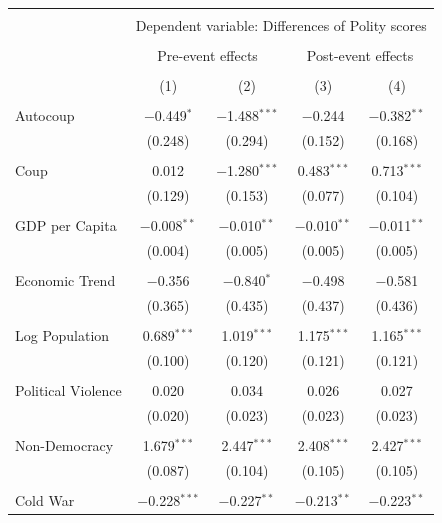 \documentclass[
  12pt,
]{report}
\begin{document}
\begin{table}
{\begin{tabular}{@{\extracolsep{30pt}}lcccc} 
\\[-1.8ex]\hline 
\hline \\[-1.8ex] 
 & \multicolumn{4}{c}{Dependent variable: Differences of Polity scores} \\ 
\cline{2-5} 
\\[-1.8ex] & \multicolumn{2}{c}{Pre-event effects} & \multicolumn{2}{c}{Post-event effects} \\ 
\\[-1.8ex] & (1) & (2) & (3) & (4)\\ 
\hline \\[-1.8ex] 
 Autocoup & $-$0.449$^{*}$ & $-$1.488$^{***}$ & $-$0.244 & $-$0.382$^{**}$ \\ 
  & (0.248) & (0.294) & (0.152) & (0.168) \\ 
  & & & & \\ 
 Coup & 0.012 & $-$1.280$^{***}$ & 0.483$^{***}$ & 0.713$^{***}$ \\ 
  & (0.129) & (0.153) & (0.077) & (0.104) \\ 
  & & & & \\ 
 GDP per Capita & $-$0.008$^{**}$ & $-$0.010$^{**}$ & $-$0.010$^{**}$ & $-$0.011$^{**}$ \\ 
  & (0.004) & (0.005) & (0.005) & (0.005) \\ 
  & & & & \\ 
 Economic Trend & $-$0.356 & $-$0.840$^{*}$ & $-$0.498 & $-$0.581 \\ 
  & (0.365) & (0.435) & (0.437) & (0.436) \\ 
  & & & & \\ 
 Log Population & 0.689$^{***}$ & 1.019$^{***}$ & 1.175$^{***}$ & 1.165$^{***}$ \\ 
  & (0.100) & (0.120) & (0.121) & (0.121) \\ 
  & & & & \\ 
 Political Violence & 0.020 & 0.034 & 0.026 & 0.027 \\ 
  & (0.020) & (0.023) & (0.023) & (0.023) \\ 
  & & & & \\ 
 Non-Democracy & 1.679$^{***}$ & 2.447$^{***}$ & 2.408$^{***}$ & 2.427$^{***}$ \\ 
  & (0.087) & (0.104) & (0.105) & (0.105) \\ 
  & & & & \\ 
 Cold War & $-$0.228$^{***}$ & $-$0.227$^{**}$ & $-$0.213$^{**}$ & $-$0.223$^{**}$ \\ 

\end{tabular}}
\end{table}
\end{document}
